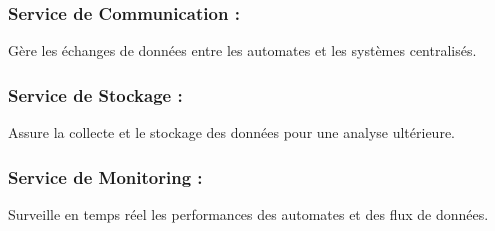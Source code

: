 \subsubsection{Service de Communication :} Gère les échanges de données entre les automates et les systèmes centralisés.
\subsubsection{Service de Stockage :} Assure la collecte et le stockage des données pour une analyse ultérieure.
\subsubsection{Service de Monitoring :} Surveille en temps réel les performances des automates et des flux de données.
